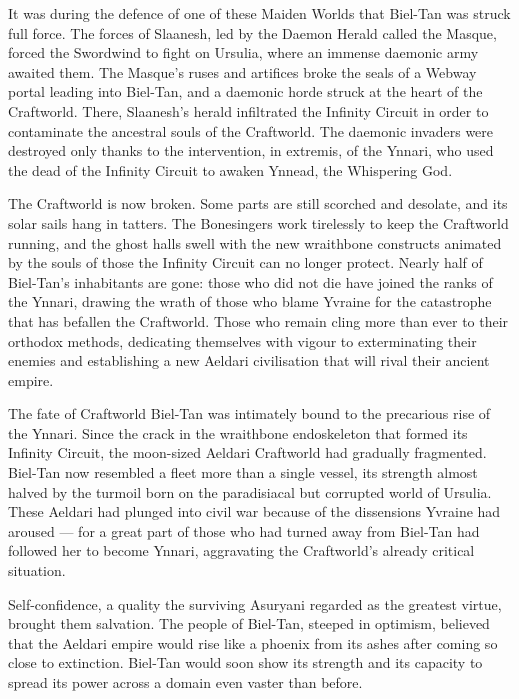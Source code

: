 It was during the defence of one of these Maiden Worlds that Biel-Tan was struck full force. The forces of Slaanesh, led by the Daemon Herald called the Masque, forced the Swordwind to fight on Ursulia, where an immense daemonic army awaited them. The Masque's ruses and artifices broke the seals of a Webway portal leading into Biel-Tan, and a daemonic horde struck at the heart of the Craftworld. There, Slaanesh's herald infiltrated the Infinity Circuit in order to contaminate the ancestral souls of the Craftworld. The daemonic invaders were destroyed only thanks to the intervention, in extremis, of the Ynnari, who used the dead of the Infinity Circuit to awaken Ynnead, the Whispering God.

The Craftworld is now broken. Some parts are still scorched and desolate, and its solar sails hang in tatters. The Bonesingers work tirelessly to keep the Craftworld running, and the ghost halls swell with the new wraithbone constructs animated by the souls of those the Infinity Circuit can no longer protect. Nearly half of Biel-Tan's inhabitants are gone: those who did not die have joined the ranks of the Ynnari, drawing the wrath of those who blame Yvraine for the catastrophe that has befallen the Craftworld. Those who remain cling more than ever to their orthodox methods, dedicating themselves with vigour to exterminating their enemies and establishing a new Aeldari civilisation that will rival their ancient empire.

The fate of Craftworld Biel-Tan was intimately bound to the precarious rise of the Ynnari. Since the crack in the wraithbone endoskeleton that formed its Infinity Circuit, the moon-sized Aeldari Craftworld had gradually fragmented. Biel-Tan now resembled a fleet more than a single vessel, its strength almost halved by the turmoil born on the paradisiacal but corrupted world of Ursulia. These Aeldari had plunged into civil war because of the dissensions Yvraine had aroused --- for a great part of those who had turned away from Biel-Tan had followed her to become Ynnari, aggravating the Craftworld's already critical situation.

Self-confidence, a quality the surviving Asuryani regarded as the greatest virtue, brought them salvation. The people of Biel-Tan, steeped in optimism, believed that the Aeldari empire would rise like a phoenix from its ashes after coming so close to extinction. Biel-Tan would soon show its strength and its capacity to spread its power across a domain even vaster than before.


